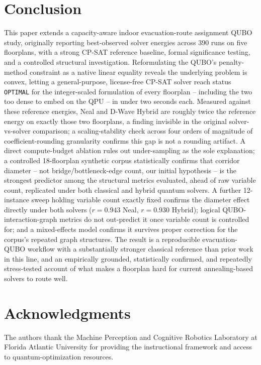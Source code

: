 \documentclass[11pt]{article}
\begin{document}
\section{Conclusion}

This paper extends a capacity-aware indoor evacuation-route assignment QUBO study, originally reporting best-observed solver energies across 390 runs on five floorplans, with a strong CP-SAT reference baseline, formal significance testing, and a controlled structural investigation. Reformulating the QUBO's penalty-method constraint as a native linear equality reveals the underlying problem is convex, letting a general-purpose, license-free CP-SAT solver reach status \texttt{OPTIMAL} for the integer-scaled formulation of every floorplan -- including the two too dense to embed on the QPU -- in under two seconds each. Measured against these reference energies, Neal and D-Wave Hybrid are roughly twice the reference energy on exactly those two floorplans, a finding invisible in the original solver-vs-solver comparison; a scaling-stability check across four orders of magnitude of coefficient-rounding granularity confirms this gap is not a rounding artifact. A direct compute-budget ablation rules out under-sampling as the sole explanation; a controlled 18-floorplan synthetic corpus statistically confirms that corridor diameter -- not bridge/bottleneck-edge count, our initial hypothesis -- is the strongest predictor among the structural metrics evaluated, ahead of raw variable count, replicated under both classical and hybrid quantum solvers. A further 12-instance sweep holding variable count exactly fixed confirms the diameter effect directly under both solvers ($r=0.943$ Neal, $r=0.930$ Hybrid); logical QUBO-interaction-graph metrics do not out-predict it once variable count is controlled for; and a mixed-effects model confirms it survives proper correction for the corpus's repeated graph structures. The result is a reproducible evacuation-QUBO workflow with a substantially stronger classical reference than prior work in this line, and an empirically grounded, statistically confirmed, and repeatedly stress-tested account of what makes a floorplan hard for current annealing-based solvers to route well.

\section*{Acknowledgments}
The authors thank the Machine Perception and Cognitive Robotics Laboratory at Florida Atlantic University for providing the instructional framework and access to quantum-optimization resources.
\end{document}
